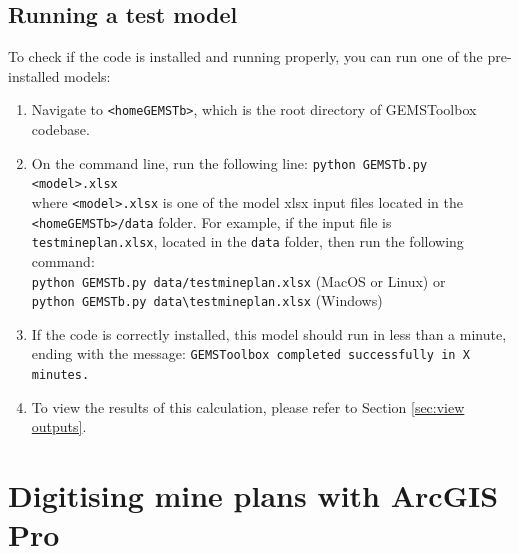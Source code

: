 \subsection{Running a test model}
To check if the code is installed and running properly, you can run one of the pre-installed models:
\begin{enumerate}
    \item Navigate to {\tt <homeGEMSTb>}, which is the root directory of GEMSToolbox codebase. 
    \item On the command line, run the following line:
    {\tt python GEMSTb.py <model>.xlsx} \\where {\tt <model>.xlsx} is one of the model xlsx input files located in the {\tt <homeGEMSTb>/data} folder. For example, if the input file is {\tt testmineplan.xlsx}, located in the {\tt data} folder, then run the following command: \\
    {\tt python GEMSTb.py data/testmineplan.xlsx} (MacOS or Linux) or\\
    {\tt python GEMSTb.py data\textbackslash testmineplan.xlsx} (Windows)
    \item If the code is correctly installed, this model should run in less than a minute, ending with the message: {\tt  GEMSToolbox completed successfully in X minutes.}
    \item To view the results of this calculation, please refer to Section \ref{sec:view outputs}.
\end{enumerate}

\section{Digitising mine plans with ArcGIS Pro}
